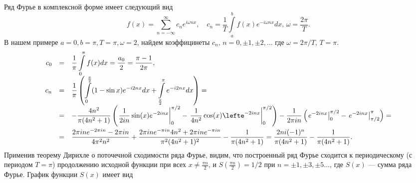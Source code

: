 \noindent
Ряд Фурье в комплексной форме имеет следующий вид
\[
f(x) = \sum_{n=-\infty}^\infty c_n e^{i\omega nx},\quad c_n=\frac{1}{T}\int\limits_a^b f(x) e^{-i\omega nx}dx,\,\omega=\frac{2\pi}{T}.
\]
В нашем примере $ a=0,b=\pi,T=\pi,\omega=2$, 
найдем коэффицинеты $c_n,\,n=0,\pm1,\pm2,\ldots$
где $\omega=2\pi/T,\,T=\pi.$
$$
\begin{array}{rcl}
c_0 &=&\displaystyle\frac{1}{\pi} \int\limits_0^{\pi} f(x)dx=\frac{a_0}{2}=\frac{\pi-1}{2\pi},\\[12pt]
c_n &=&\displaystyle\frac{1}{\pi}\left(
\int\limits_0^\frac{\pi}{2}
(1-\sin{x})e^{-i2nx}dx+ \int\limits_\frac{\pi}{2}^\pi
e^{-i2nx}dx \right) ={}\\[12pt]
&=&\displaystyle-\frac{4n^2}{\pi(4n^2+1)}\left(
\left.\frac{1}{2in}\sin (x) e^{-2in x} \right|_0^{\pi/2} -\left.\frac{1}{4n^2}\cos (x)\lefte^{-2in x}\right|_0^{\pi/2}\right)
-\frac{1}{2{\pi}in}\left(
\left.e^{-2in x} \right|_0^{\pi/2} -\left.e^{-2in x}\right|_{\pi/2}^{\pi}\right)
= \\[12pt]
&=&\displaystyle\frac{2{\pi}in e^{-2{\pi}in}-2{\pi}in}{4{\pi}^2n^2}+\frac{2{\pi}in e^{-{\pi}in}4n^2+2{\pi}in e^{-{\pi}in}}{{\pi}^2(4n^2+1)^2} - \frac{1}{{\pi}(4n^2+1)} 
=\frac{2ni(-1)^n}{\pi(4n^2+1)}-\frac{1}{\pi(4n^2+1)}.
\end{array}
$$
\noindent
Применив теорему Дирихле о поточечной сходимости ряда Фурье, видим, что построенный ряд Фурье сходится 
к периодическому (с периодом $T=\pi$) продолжению исходной функции при всех $x\ne \frac{\pi n}{2}$, и $S(\frac{\pi n}{2})=1/2$ при 
$n= \pm1,\pm3, \pm5 \ldots$, где $S(x)$ --- сумма ряда Фурье. График функции $S(x)$ имеет вид

